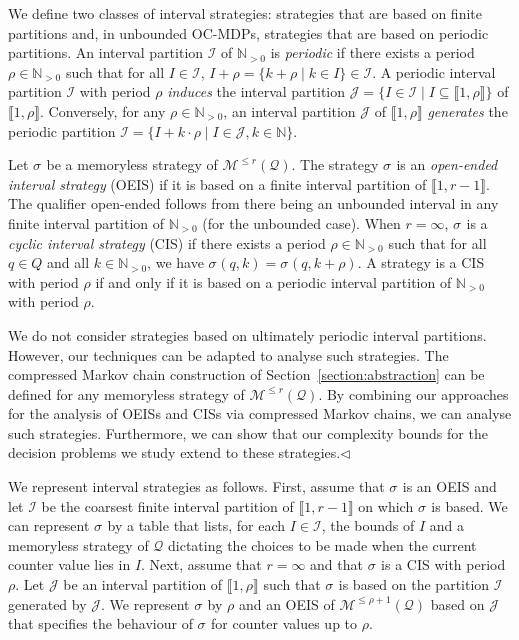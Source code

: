 \documentclass[a4paper,UKenglish,cleveref,autoref,thm-restate,colorlinks]{lipics-v2021}
\newcommand{\integerInterval}[1]{\llbracket{}#1\rrbracket{}}
\newcommand{\IN}{\mathbb{N}}
\newcommand{\INpos}{\IN_{>0}}
\newcommand{\mdp}{\mathcal{M}}
\newcommand{\ocmdp}{\mathcal{Q}}
\newcommand{\ocmdpFin}[2]{\mdp^{\leq #2}(#1)}
\newcommand{\ocStateSpace}{Q}
\newcommand{\ocState}{q}
\newcommand{\ocCount}{k}
\newcommand{\counterUB}{r}
\newcommand{\period}{\rho}
\newcommand{\intPart}{\mathcal{I}}
\newcommand{\intPartB}{\mathcal{J}}
\newcommand{\interval}{I}
\newcommand{\stratGeneric}[1]{{\sigma_{#1}}}
\newcommand{\strat}{\stratGeneric{}}
\begin{document}
We define two classes of interval strategies: strategies that are based on finite partitions and, in unbounded OC-MDPs, strategies that are based on periodic partitions.
An interval partition $\intPart$ of $\INpos$ is \textit{periodic} if there exists a period $\period\in\INpos$ such that for all $\interval\in\intPart$, $\interval+\period = \{\ocCount+\period\mid\ocCount\in\interval\}\in\intPart$.
A periodic interval partition $\intPart$ with period $\period$ \textit{induces} the interval partition $\intPartB = \{\interval\in\intPart\mid\interval\subseteq\integerInterval{1, \period}\}$ of $\integerInterval{1, \period}$.
Conversely, for any $\period\in\INpos$, an interval partition $\intPartB$ of $\integerInterval{1, \period}$ \textit{generates} the periodic partition $\intPart = \{\interval+\ocCount\cdot\period\mid\interval\in\intPartB, \ocCount\in\IN\}$.

Let $\strat$ be a memoryless strategy of $\ocmdpFin{\ocmdp}{\counterUB}$.
The strategy $\strat$ is an \textit{open-ended interval strategy} (OEIS) if it is based on a finite interval partition of $\integerInterval{1, \counterUB-1}$.
The qualifier open-ended follows from there being an unbounded interval in any finite interval partition of $\INpos$ (for the unbounded case).
When $\counterUB=\infty$, $\strat$ is a \textit{cyclic interval strategy} (CIS) if there exists a period $\period\in\INpos$ such that for all $\ocState\in\ocStateSpace$ and all $\ocCount\in\INpos$, we have $\strat(\ocState, \ocCount) = \strat(\ocState, \ocCount+\period)$.
A strategy is a CIS with period $\period$ if and only if it is based on a periodic interval partition of $\INpos$ with period $\period$.\begin{remark}
  We do not consider strategies based on ultimately periodic interval partitions.
  However, our techniques can be adapted to analyse such strategies.
  The compressed Markov chain construction of Section~\ref{section:abstraction} can be defined for any memoryless strategy of $\ocmdpFin{\ocmdp}{\counterUB}$.
  By combining our approaches for the analysis of OEISs and CISs via compressed Markov chains, we can analyse such strategies.
  Furthermore, we can show that our complexity bounds for the decision problems we study extend to these strategies.\hfill$\lhd$
\end{remark}

We represent interval strategies as follows.
First, assume that $\strat$ is an OEIS and let $\intPart$ be the coarsest finite interval partition of $\integerInterval{1, \counterUB-1}$ on which $\strat$ is based.
We can represent $\strat$ by a table that lists, for each $\interval\in\intPart$, the bounds of $\interval$ and a memoryless strategy of $\ocmdp$ dictating the choices to be made when the current counter value lies in $\interval$.
Next, assume that $\counterUB=\infty$ and that $\strat$ is a CIS with period $\period$.
Let $\intPartB$ be an interval partition of $\integerInterval{1, \period}$ such that $\strat$ is based on the partition $\intPart$ generated by $\intPartB$.
We represent $\strat$ by $\period$ and an OEIS of $\ocmdpFin{\ocmdp}{\period+1}$ based on $\intPartB$ that specifies the behaviour of $\strat$ for counter values up to $\period$.
\end{document}
